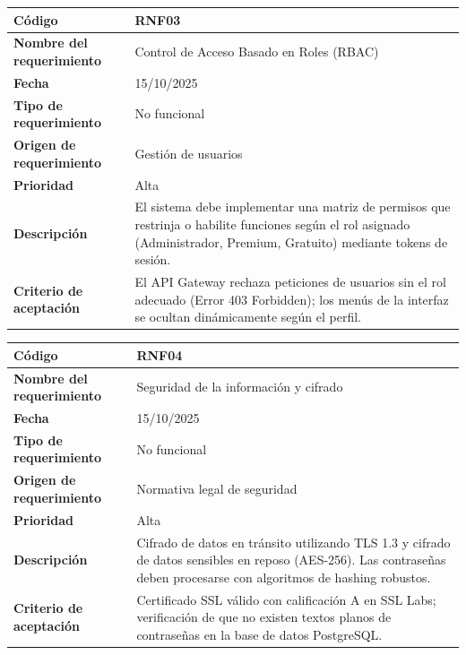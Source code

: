 \begin{table}[H]
	\begin{tabular}{|s{5cm}|m{11cm}|}
		\hline
		\textbf{Código} & RNF03 \\ \hline
		\textbf{Nombre del requerimiento} & Control de Acceso Basado en Roles (RBAC) \\ \hline
		\textbf{Fecha} & 15/10/2025 \\ \hline
		\textbf{Tipo de requerimiento} & No funcional \\ \hline
		\textbf{Origen de requerimiento} & Gestión de usuarios \\ \hline
		\textbf{Prioridad} & Alta \\ \hline
		\textbf{Descripción} & El sistema debe implementar una matriz de permisos que restrinja o habilite funciones según el rol asignado (Administrador, Premium, Gratuito) mediante tokens de sesión. \\ \hline
		\textbf{Criterio de aceptación} & El API Gateway rechaza peticiones de usuarios sin el rol adecuado (Error 403 Forbidden); los menús de la interfaz se ocultan dinámicamente según el perfil. \\ \hline
	\end{tabular}
\end{table}

\begin{table}[H]
	\begin{tabular}{|s{5cm}|m{11cm}|}
		\hline
		\textbf{Código} & RNF04 \\ \hline
		\textbf{Nombre del requerimiento} & Seguridad de la información y cifrado \\ \hline
		\textbf{Fecha} & 15/10/2025 \\ \hline
		\textbf{Tipo de requerimiento} & No funcional \\ \hline
		\textbf{Origen de requerimiento} & Normativa legal de seguridad \\ \hline
		\textbf{Prioridad} & Alta \\ \hline
		\textbf{Descripción} & Cifrado de datos en tránsito utilizando TLS 1.3 y cifrado de datos sensibles en reposo (AES-256). Las contraseñas deben procesarse con algoritmos de hashing robustos. \\ \hline
		\textbf{Criterio de aceptación} & Certificado SSL válido con calificación A en SSL Labs; verificación de que no existen textos planos de contraseñas en la base de datos PostgreSQL. \\ \hline
	\end{tabular}
\end{table}

